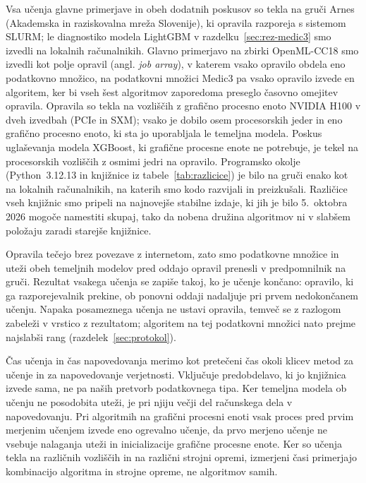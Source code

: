 \documentclass[a4paper,12pt,openright]{book}
\begin{document}
Vsa učenja glavne primerjave in obeh dodatnih poskusov so tekla na gruči
Arnes (Akademska in raziskovalna mreža Slovenije), ki opravila razporeja s
sistemom SLURM; le diagnostiko modela LightGBM v razdelku~\ref{sec:rez-medic3}
smo izvedli na lokalnih računalnikih.
Glavno primerjavo na zbirki OpenML-CC18 smo izvedli kot polje opravil (angl.
\emph{job array}), v katerem vsako opravilo obdela eno podatkovno množico, na
podatkovni množici Medic3 pa vsako opravilo izvede en algoritem, ker bi vseh
šest algoritmov zaporedoma preseglo časovno omejitev opravila. Opravila so
tekla na vozliščih z grafično procesno enoto NVIDIA H100 v dveh izvedbah (PCIe
in SXM); vsako je dobilo osem procesorskih jeder in eno grafično procesno
enoto, ki sta jo uporabljala le temeljna modela. Poskus uglaševanja modela
XGBoost, ki grafične procesne enote ne potrebuje, je tekel na procesorskih
vozliščih z osmimi jedri na opravilo. Programsko okolje (Python~3.12.13 in
knjižnice iz tabele~\ref{tab:razlicice}) je bilo na gruči enako kot na
lokalnih računalnikih, na katerih smo kodo razvijali in preizkušali.
Različice vseh knjižnic smo pripeli na najnovejše stabilne izdaje, ki jih je
bilo 5.~oktobra 2026 mogoče namestiti skupaj, tako da nobena družina algoritmov
ni v slabšem položaju zaradi starejše knjižnice.

Opravila tečejo brez povezave z internetom, zato smo podatkovne množice in
uteži obeh temeljnih modelov pred oddajo opravil prenesli v predpomnilnik na
gruči. Rezultat vsakega učenja se zapiše takoj, ko je učenje
končano: opravilo, ki ga razporejevalnik prekine, ob ponovni oddaji nadaljuje
pri prvem nedokončanem učenju. Napaka posameznega učenja ne ustavi opravila,
temveč se z razlogom zabeleži v vrstico z rezultatom; algoritem na tej
podatkovni množici nato prejme najslabši rang (razdelek~\ref{sec:protokol}).

Čas učenja in čas napovedovanja merimo kot pretečeni čas okoli klicev metod za
učenje in za napovedovanje verjetnosti. Vključuje predobdelavo, ki jo knjižnica
izvede sama, ne pa naših pretvorb podatkovnega tipa. Ker temeljna modela ob
učenju ne posodobita uteži, je pri njiju večji del računskega dela v
napovedovanju. Pri algoritmih na
grafični procesni enoti vsak proces pred prvim merjenim učenjem izvede eno
ogrevalno učenje, da prvo merjeno učenje ne vsebuje nalaganja uteži in
inicializacije grafične procesne enote. Ker so učenja tekla na različnih
vozliščih in na različni strojni opremi, izmerjeni časi primerjajo kombinacijo
algoritma in strojne opreme, ne algoritmov samih.
\end{document}
